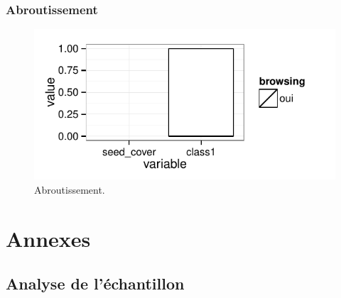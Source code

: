 \documentclass[a4paper]{book}\usepackage[]{graphicx}\usepackage[]{color}
\makeatletter
\def\maxwidth{ %
  \ifdim\Gin@nat@width>\linewidth
    \linewidth
  \else
    \Gin@nat@width
  \fi
}
\newenvironment{knitrout}{}{} %
\makeatother
\begin{document}
\subsection{Abroutissement}
\begin{knitrout}\footnotesize
{}\color{fgcolor}\begin{figure}[h]


{\centering \includegraphics[width=\maxwidth]{Figures/Abroutissement-1} 

}

\caption[Abroutissement]{Abroutissement.\label{fig:Abroutissement}}
\end{figure}


\end{knitrout}




\chapter{Annexes}

\section{Analyse de l'échantillon}
\end{document}
